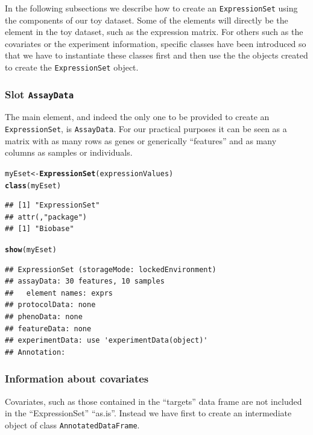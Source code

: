 \documentclass[a4paper]{article}\usepackage[]{graphicx}\usepackage[]{color}
\makeatletter
\newcommand{\hlstd}[1]{\textcolor[rgb]{0.345,0.345,0.345}{#1}}%
\newcommand{\hlkwb}[1]{\textcolor[rgb]{0.69,0.353,0.396}{#1}}%
\newcommand{\hlkwd}[1]{\textcolor[rgb]{0.737,0.353,0.396}{\textbf{#1}}}%
\newenvironment{kframe}{%
 \def\at@end@of@kframe{}%
 \ifinner\ifhmode%
  \def\at@end@of@kframe{\end{minipage}}%
  \begin{minipage}{\columnwidth}%
 \fi\fi%
 \def\FrameCommand##1{\hskip\@totalleftmargin \hskip-\fboxsep
 \colorbox{shadecolor}{##1}\hskip-\fboxsep
     \hskip-\linewidth \hskip-\@totalleftmargin \hskip\columnwidth}%
 \MakeFramed {\advance\hsize-\width
   \@totalleftmargin\z@ \linewidth\hsize
   \@setminipage}}%
 {\par\unskip\endMakeFramed%
 \at@end@of@kframe}
\newenvironment{knitrout}{}{} %
\makeatother
\begin{document}
In the following subsections we describe how to create an \texttt{ExpressionSet} using the components of our toy dataset. Some of the elements will directly be the element in the toy dataset, such as the expression  matrix. For others such as the covariates or the experiment information, specific classes have been introduced so that we have to instantiate these classes first and then use the the objects created to create the \texttt{ExpressionSet} object. 

\subsubsection{Slot \texttt{AssayData}}

The main element, and indeed the only one to be provided to create an \texttt{ExpressionSet}, is \texttt{AssayData}. For our practical purposes it can be seen as a matrix with as many rows as genes or generically ``features'' and as many columns as samples or individuals.


\begin{knitrout}
\color{fgcolor}\begin{kframe}
\begin{alltt}
\hlstd{myEset} \hlkwb{<-} \hlkwd{ExpressionSet}\hlstd{(expressionValues)}
\hlkwd{class}\hlstd{(myEset)}
\end{alltt}
\begin{verbatim}
## [1] "ExpressionSet"
## attr(,"package")
## [1] "Biobase"
\end{verbatim}
\begin{alltt}
\hlkwd{show}\hlstd{(myEset)}
\end{alltt}
\begin{verbatim}
## ExpressionSet (storageMode: lockedEnvironment)
## assayData: 30 features, 10 samples 
##   element names: exprs 
## protocolData: none
## phenoData: none
## featureData: none
## experimentData: use 'experimentData(object)'
## Annotation:
\end{verbatim}
\end{kframe}
\end{knitrout}


\subsubsection{Information about covariates}

Covariates, such as those contained in the ``targets'' data frame are not included in the ``ExpressionSet'' ``as.is''. Instead we have first to create an intermediate object of class \texttt{AnnotatedDataFrame}. 
\end{document}
